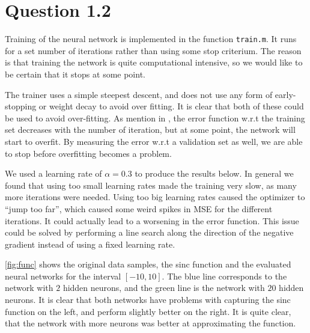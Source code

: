 \documentclass[11pt,a4paper]{article}
\newcommand{\mono}[1]{\texttt{#1}}
\begin{document}
\section{Question 1.2}
Training of the neural network is implemented in the function \mono{train.m}.
It runs for a set number of iterations rather than using some stop criterium.
The reason is that training the network is quite computational intensive, so
we would like to be certain that it stops at some point.

The trainer uses a simple steepest descent, and does not use any form of
early-stopping or weight decay to avoid over fitting. It is clear that both of
these could be used to avoid over-fitting. As mention in \cite{Bishop}, the
error function w.r.t the training set decreases with the number of iteration,
but at some point, the network will start to overfit. By measuring the error
w.r.t a validation set as well, we are able to stop before overfitting becomes
a problem.

We used a learning rate of $\alpha = 0.3$ to produce the results below. In
general we found that using too small learning rates made the training very
slow, as many more iterations were needed. Using too big learning rates
caused the optimizer to ``jump too far'', which caused some weird spikes in
MSE for the different iterations. It could actually lead to a worsening in the
error function. This issue could be solved by performing a line search along
the direction of the negative gradient instead of using a fixed learning rate.

\autoref{fig:func} shows the original data samples, the sinc function and
the evaluated neural networks for the interval $[-10, 10]$. The blue line
corresponds to the network with $2$ hidden neurons, and the green line is the
network with $20$ hidden neurons. It is clear that both networks have problems
with capturing the sinc function on the left, and perform slightly better
on the right. It is quite clear, that the network with more neurons was better
at approximating the function.
\end{document}
